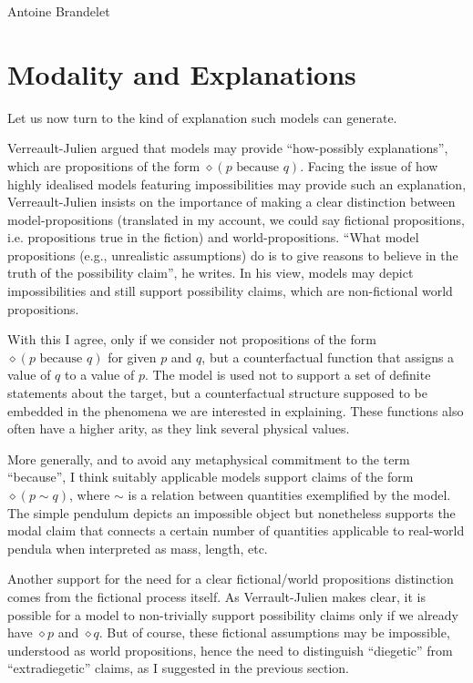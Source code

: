 \begin{artengenv}{Antoine Brandelet}
\section{Modality and Explanations}\label{sec:modality}


Let us now turn to the kind of explanation such models can generate.

Verreault-Julien\parencite*{VerreaultJulien2019} argued that models may provide ``how-possibly explanations'', which are propositions of the form $\diamond (p \text{ because } q)$. Facing the issue of how highly idealised models featuring impossibilities may provide such an explanation, Verreault-Julien insists on the importance of making a clear distinction between model-propositions (translated in my account, we could say fictional propositions, i.e. propositions true in the fiction) and world-propositions. ``What model propositions (e.g., unrealistic assumptions) do is to give reasons to believe in the truth of the possibility claim'', he writes. In his view, models may depict impossibilities and still support possibility claims, which are non-fictional world propositions.

With this I agree, only if we consider not propositions of the form $\diamond (p \text{ because } q)$ for given $p$ and $q$, but a counterfactual function that assigns a value of $q$ to a value of $p$. The model is used not to support a set of definite statements about the target, but a counterfactual structure supposed to be embedded in the phenomena we are interested in explaining. These functions also often have a higher arity, as they link several physical values.

More generally, and to avoid any metaphysical commitment to the term ``because'', I think suitably applicable models support claims of the form $\diamond (p \sim q)$, where $\sim$ is a relation between quantities exemplified by the model. The simple pendulum depicts an impossible object but nonetheless supports the modal claim that connects a certain number of quantities applicable to real-world pendula when interpreted as mass, length, etc.

Another support for the need for a clear fictional/world propositions  distinction comes from the fictional process itself. As Verrault-Julien makes clear, it is possible for a model to non-trivially support possibility claims only if we already have $\diamond p$ and $\diamond q$. But of course, these fictional assumptions may be impossible, understood as world propositions, hence the need to distinguish ``diegetic'' from ``extradiegetic'' claims, as I suggested in the previous section.


\end{artengenv}
